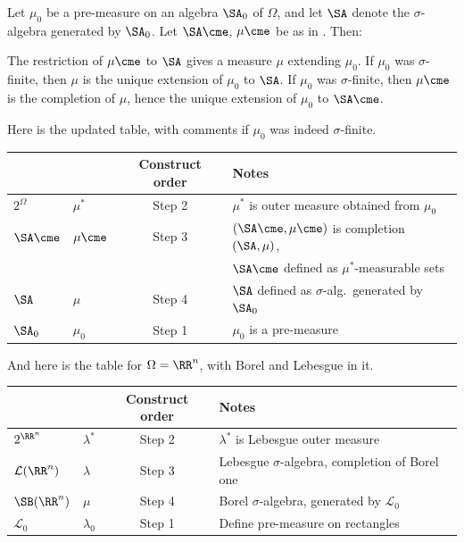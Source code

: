 \begin{theorem}
	\label{thm:cara_premeasure}
	Let $\mu_0$ be a pre-measure on an algebra $\SA_0$ of $\Omega$,
	and let $\SA$ denote the $\sigma$-algebra generated by $\SA_0$.
	Let $\SA\cme$, $\mu\cme$ be as in .
	Then:
	\begin{enumerate}[(a)]
		\ii The restriction of $\mu\cme$ to $\SA$
		gives a measure $\mu$ extending $\mu_0$.
		\ii If $\mu_0$ was $\sigma$-finite,
		then $\mu$ is the unique extension of $\mu_0$ to $\SA$.
		\ii If $\mu_0$ was $\sigma$-finite,
		then $\mu\cme$ is the completion of $\mu$,
		hence the unique extension of $\mu_0$ to $\SA\cme$.
	\end{enumerate}
\end{theorem}
Here is the updated table, with comments if $\mu_0$ was indeed $\sigma$-finite.
\begin{center}
	\begin{tabular}[h]{llcl}
		& & Construct order & Notes \\ \hline
		$2^\Omega$ & $\mu^\ast$ & Step 2 &
			$\mu^\ast$ is outer measure obtained from $\mu_0$ \\[1em]
		$\SA\cme$ & $\mu\cme$ & Step 3 & $(\SA\cme, \mu\cme)$ is completion $(\SA, \mu)$, \\
		&&& $\SA\cme$ defined as $\mu^\ast$-measurable sets \\[1em]
		$\SA$ & $\mu$ & Step 4 & $\SA$ defined as $\sigma$-alg.\ generated by $\SA_0$ \\[1em]
		$\SA_0$ & $\mu_0$ & Step 1 & $\mu_0$ is a pre-measure
	\end{tabular}
\end{center}
And here is the table for $\Omega = \RR^n$,
with Borel and Lebesgue in it.
\begin{center}
	\begin{tabular}[h]{llcl}
		& & Construct order & Notes \\ \hline
		$2^{\RR^n}$ & $\lambda^\ast$ & Step 2 &
			$\lambda^\ast$ is Lebesgue outer measure \\[1em]
		$\mathcal L(\RR^n)$ & $\lambda$ & Step 3 &
			Lebesgue $\sigma$-algebra, completion of Borel one \\[1em]
		$\SB(\RR^n)$ & $\mu$ & Step 4 &
			Borel $\sigma$-algebra, generated by $\mathcal{L}_0$ \\[1em]
		$\mathcal L_0$ & $\lambda_0$ & Step 1 & Define pre-measure on rectangles
	\end{tabular}
\end{center}

